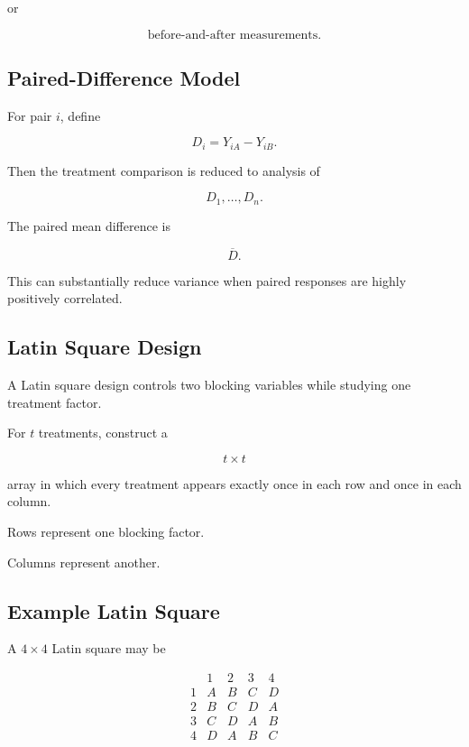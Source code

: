 or

\[
\boxed{
\text{before-and-after measurements}.
}
\]

\subsection{Paired-Difference Model}
\label{subsec:paired-difference-design}

For pair \(i\), define

\[
\boxed{
D_i
=
Y_{iA}-Y_{iB}.
}
\]

Then the treatment comparison is reduced to analysis of

\[
D_1,\ldots,D_n.
\]

The paired mean difference is

\[
\boxed{
\overline{D}.
}
\]

This can substantially reduce variance when paired responses are highly
positively correlated.

\subsection{Latin Square Design}
\label{subsec:latin-square-design}

A Latin square design controls two blocking variables while studying one
treatment factor.

For \(t\) treatments, construct a

\[
t\times t
\]

array in which every treatment appears exactly once in each row and once
in each column.

Rows represent one blocking factor.

Columns represent another.

\subsection{Example Latin Square}
\label{subsec:example-latin-square}

A \(4\times4\) Latin square may be

\[
\begin{array}{c|cccc}
&
1&2&3&4\\
\hline
1&A&B&C&D\\
2&B&C&D&A\\
3&C&D&A&B\\
4&D&A&B&C
\end{array}
\]

